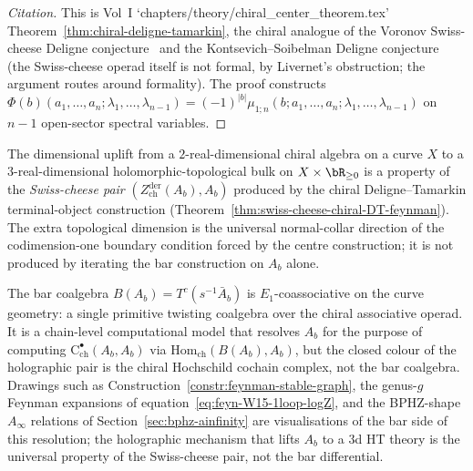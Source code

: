 \begin{proof}[Citation]
This is Vol~I `chapters/theory/chiral\_center\_theorem.tex'
Theorem~\ref{thm:chiral-deligne-tamarkin}, the chiral analogue of
the Voronov Swiss-cheese Deligne conjecture~\cite{Voronov99} and the
Kontsevich--Soibelman Deligne conjecture~\cite{KS00} \textup{(}the
Swiss-cheese operad itself is not formal, by Livernet's obstruction;
the argument routes around formality\textup{)}. The proof
constructs $\Phi(b)(a_1, \ldots, a_n; \lambda_1, \ldots, \lambda_{n-1})
= (-1)^{|b|} \mu_{1;n}(b; a_1, \ldots, a_n; \lambda_1, \ldots,
\lambda_{n-1})$ on $n-1$ open-sector spectral variables.
\end{proof}

\begin{remark}
\label{rem:swiss-cheese-not-bar-feynman}
The dimensional uplift from a $2$-real-dimensional chiral algebra
on a curve $X$ to a $3$-real-dimensional holomorphic-topological
bulk on $X \times \bR_{\ge 0}$ is a property of the
\emph{Swiss-cheese pair} $(Z^{\mathrm{der}}_{\mathrm{ch}}(A_b),
A_b)$ produced by the chiral Deligne--Tamarkin terminal-object
construction (Theorem~\ref{thm:swiss-cheese-chiral-DT-feynman}).
The extra topological dimension is the universal normal-collar
direction of the codimension-one boundary condition forced by the
centre construction; it is not produced by iterating the bar
construction on $A_b$ alone.

The bar coalgebra $B(A_b) = T^c(s^{-1} \bar{A}_b)$ is
$E_1$-coassociative on the curve geometry: a single primitive
twisting coalgebra over the chiral associative operad. It is a
chain-level computational model
that resolves $A_b$ for the purpose of computing
$\mathrm{C}^\bullet_{\mathrm{ch}}(A_b, A_b)$ via
$\mathrm{Hom}_{\mathrm{ch}}(B(A_b), A_b)$, but the closed colour
of the holographic pair is the chiral Hochschild cochain complex,
not the bar coalgebra. Drawings such as
Construction~\ref{constr:feynman-stable-graph}, the genus-$g$
Feynman expansions of equation~\eqref{eq:feyn-W15-1loop-logZ}, and
the BPHZ-shape $A_\infty$ relations of
Section~\ref{sec:bphz-ainfinity} are visualisations of the bar
side of this resolution; the holographic mechanism that lifts $A_b$
to a $3$d HT theory is the universal property of the Swiss-cheese
pair, not the bar differential.
\end{remark}

